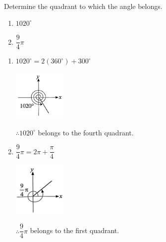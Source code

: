 \documentclass{report}
\begin{document}
\begin{question}
    Determine the quadrant to which the angle belongs.
    \vspace{-1em}
    \begin{multicols}{2}
        \begin{enumerate}[label=(\alph*)]
            \item $1020^\circ$
            \item $\dfrac{9}{4}\pi$
        \end{enumerate}
    \end{multicols}

    \sol{}
    \begin{multicols}{2}
        \begin{enumerate}[label=(\alph*)]
            \item $1020^\circ = 2(360^\circ) + 300^\circ$
                
            \includegraphics[width=0.2\textwidth]{assets/9-2.jpg}
            
            $\therefore 1020^\circ$ belongs to the fourth quadrant.
            \columnbreak

            \item $\dfrac{9}{4}\pi = 2\pi + \dfrac{\pi}{4}$
                
            \includegraphics[width=0.2\textwidth]{assets/9-3.jpg}
            
            $\therefore \dfrac{9}{4}\pi$ belongs to the first quadrant.
        \end{enumerate}
    \end{multicols}
\end{question}
\end{document}

